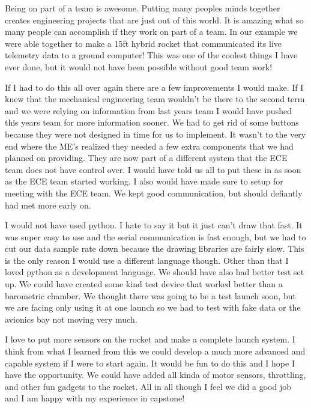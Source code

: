 \documentclass[10pt,draftclsnofoot,onecolumn,retainorgcmds]{IEEEtran}
\begin{document}
Being on part of a team is awesome. Putting many peoples minds together creates engineering projects that are just out of this world. It is amazing what so many people can accomplish if they work on part of a team. In our example we were able together to make a 15ft hybrid rocket that communicated its live telemetry data to a ground computer! This was one of the coolest things I have ever done, but it would not have been possible without good team work! \par
If I had to do this all over again there are a few improvements I would make. If I knew that the mechanical engineering team wouldn't be there to the second term and we were relying on information from last years team I would have pushed this years team for more information sooner. We had to get rid of some buttons because they were not designed in time for us to implement. It wasn't to the very end where the ME's realized they needed a few extra components that we had planned on providing. They are now part of a different system that the ECE team does not have control over. I would have told us all to put these in as soon as the ECE team started working. I also would have made sure to setup for meeting with the ECE team. We kept good communication, but should defiantly had met more early on. \par
I would not have used python. I hate to say it but it just can't draw that fast. It was super easy to use and the serial communication is fast enough, but we had to cut our data sample rate down because the drawing libraries are fairly slow. This is the only reason I would use a different language though. Other than that I loved python as a development language. We should have also had better test set up. We could have created some kind test device that worked better than a barometric chamber. We thought there was going to be a test launch soon, but we are facing only using it at one launch so we had to test with fake data or the avionics bay not moving very much. \par
I love to put more sensors on the rocket and make a complete launch system. I think from what I learned from this we could develop a much more advanced and capable system if I were to start again. It would be fun to do this and I hope I have the opportunity. We could have added all kinda of motor sensors, throttling, and other fun gadgets to the rocket. All in all though I feel we did a good job and I am happy with my experience in capstone!
\end{document}

